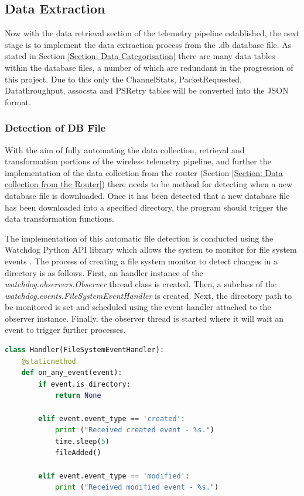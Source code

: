 \subsection{Data Extraction} \label{section:Data Extraction}

Now with the data retrieval section of the telemetry pipeline established, the next stage is to implement the data extraction process from the .db database file. As stated in Section \ref{Section: Data Categorisation} there are many data tables within the database files, a number of which are redundant in the progression of this project. Due to this only the ChannelStats, PacketRequested, Datathroughput, assocsta and PSRetry tables will be converted into the JSON format. 

\subsubsection{Detection of DB File}

With the aim of fully automating the data collection, retrieval and transformation portions of the wireless telemetry pipeline, and further the implementation of the data collection from the router (Section \ref{Section: Data collection from the Router}) there needs to be method for detecting when a new database file is downloaded. Once it has been detected that a new database file has been downloaded into a specified directory, the program should trigger the data transformation functions. 

The implementation of this automatic file detection is conducted using the Watchdog Python API library which allows the system to monitor for file system events \cite{watchdog}. The process of creating a file system monitor to detect changes in a directory is as follows. First, an handler instance of the \textit{watchdog.observers.Observer} thread class is created. Then, a subclass of the \textit{watchdog.events.FileSystemEventHandler} is created. Next, the directory path to be monitored is set and scheduled using the event handler attached to the observer instance. Finally, the observer thread is started where it will wait an event to trigger further processes. 

\begin{lstlisting}[language=Python, caption={Watchdog File System Event Handler Code Snippet}, label={lst:watchodog}]
class Handler(FileSystemEventHandler):
    @staticmethod
    def on_any_event(event):
        if event.is_directory:
            return None

        elif event.event_type == 'created':
            print ("Received created event - %s.")
            time.sleep(5)
            fileAdded()

        elif event.event_type == 'modified':
            print ("Received modified event - %s.")
\end{lstlisting}

